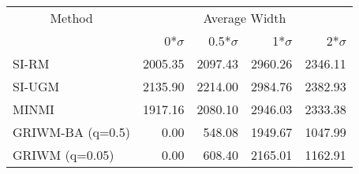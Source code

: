 
\begin{tabular}{lrrrr}
\toprule
\multicolumn{1}{c}{Method} & \multicolumn{4}{c}{Average Width} \\
 & 0*$\sigma$ & 0.5*$\sigma$ & 1*$\sigma$ & 2*$\sigma$\\
\midrule
SI-RM & 2005.35 & 2097.43 & 2960.26 & 2346.11\\
SI-UGM & 2135.90 & 2214.00 & 2984.76 & 2382.93\\
MINMI & 1917.16 & 2080.10 & 2946.03 & 2333.38\\
GRIWM-BA (q=0.5) & 0.00 & 548.08 & 1949.67 & 1047.99\\
GRIWM (q=0.05) & 0.00 & 608.40 & 2165.01 & 1162.91\\
\bottomrule
\end{tabular}
